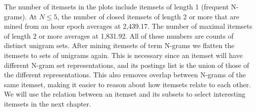 \documentclass[letterpaper,12pt,titlepage,oneside,final]{book}
\begin{document}
The number of itemsets in the plots include 
itemsets of length 1 (frequent N-grams). 
At $N \le 5$, the number of closed itemsets of length 2 or more
that are mined from an hour epoch averages at 2,439.17.
The number of maximal itemsets of length 2 or more
averages at 1,831.92.
All of these numbers are counts of distinct unigram sets.
After mining itemsets of term N-grams we flatten the itemsets to sets of unigrams again.
This is necessary since an itemset will have different N-gram set representations,
and its postings list is the union of those of the different representations.
This also removes overlap between N-grams of the same itemset,
making it easier to reason about how itemsets relate to each other.
We will use the relation between an itemset and its subsets to
select interesting itemsets in the next chapter.


\end{document}
